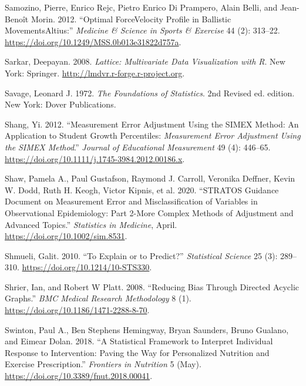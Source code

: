 \documentclass[
]{book}
\newlength{\cslhangindent}
\newenvironment{cslreferences}%
  {\setlength{\parindent}{0pt}%
  \everypar{\setlength{\hangindent}{\cslhangindent}}\ignorespaces}%
  {\par}
\begin{document}
\begin{cslreferences}
\leavevmode\hypertarget{ref-samozinoOptimalForceVelocity2012}{}%
Samozino, Pierre, Enrico Rejc, Pietro Enrico Di Prampero, Alain Belli, and Jean-Benoît Morin. 2012. ``Optimal ForceVelocity Profile in Ballistic MovementsAltius:'' \emph{Medicine \& Science in Sports \& Exercise} 44 (2): 313--22. \url{https://doi.org/10.1249/MSS.0b013e31822d757a}.

\leavevmode\hypertarget{ref-R-lattice}{}%
Sarkar, Deepayan. 2008. \emph{Lattice: Multivariate Data Visualization with R}. New York: Springer. \url{http://lmdvr.r-forge.r-project.org}.

\leavevmode\hypertarget{ref-savageFoundationsStatistics1972}{}%
Savage, Leonard J. 1972. \emph{The Foundations of Statistics}. 2nd Revised ed. edition. New York: Dover Publications.

\leavevmode\hypertarget{ref-shangMeasurementErrorAdjustment2012}{}%
Shang, Yi. 2012. ``Measurement Error Adjustment Using the SIMEX Method: An Application to Student Growth Percentiles: \emph{Measurement Error Adjustment Using} \emph{the} \emph{SIMEX Method}.'' \emph{Journal of Educational Measurement} 49 (4): 446--65. \url{https://doi.org/10.1111/j.1745-3984.2012.00186.x}.

\leavevmode\hypertarget{ref-shawSTRATOSGuidanceDocument2020}{}%
Shaw, Pamela A., Paul Gustafson, Raymond J. Carroll, Veronika Deffner, Kevin W. Dodd, Ruth H. Keogh, Victor Kipnis, et al. 2020. ``STRATOS Guidance Document on Measurement Error and Misclassification of Variables in Observational Epidemiology: Part 2-More Complex Methods of Adjustment and Advanced Topics.'' \emph{Statistics in Medicine}, April. \url{https://doi.org/10.1002/sim.8531}.

\leavevmode\hypertarget{ref-shmueliExplainPredict2010}{}%
Shmueli, Galit. 2010. ``To Explain or to Predict?'' \emph{Statistical Science} 25 (3): 289--310. \url{https://doi.org/10.1214/10-STS330}.

\leavevmode\hypertarget{ref-shrierReducingBiasDirected2008}{}%
Shrier, Ian, and Robert W Platt. 2008. ``Reducing Bias Through Directed Acyclic Graphs.'' \emph{BMC Medical Research Methodology} 8 (1). \url{https://doi.org/10.1186/1471-2288-8-70}.

\leavevmode\hypertarget{ref-swintonStatisticalFrameworkInterpret2018}{}%
Swinton, Paul A., Ben Stephens Hemingway, Bryan Saunders, Bruno Gualano, and Eimear Dolan. 2018. ``A Statistical Framework to Interpret Individual Response to Intervention: Paving the Way for Personalized Nutrition and Exercise Prescription.'' \emph{Frontiers in Nutrition} 5 (May). \url{https://doi.org/10.3389/fnut.2018.00041}.


\end{cslreferences}
\end{document}
